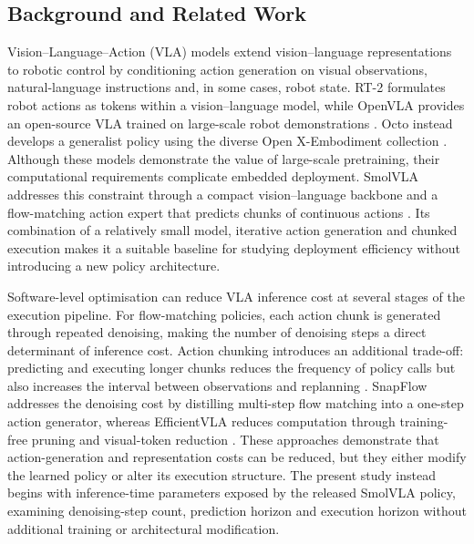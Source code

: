 \subsection{Background and Related Work}
Vision--Language--Action (VLA) models extend vision--language representations to robotic control by conditioning action generation on visual observations, natural-language instructions and, in some cases, robot state. RT-2 formulates robot actions as tokens within a vision--language model, while OpenVLA provides an open-source VLA trained on large-scale robot demonstrations \cite{rt2,openvla}. Octo instead develops a generalist policy using the diverse Open X-Embodiment collection \cite{octo,openx}. Although these models demonstrate the value of large-scale pretraining, their computational requirements complicate embedded deployment. SmolVLA addresses this constraint through a compact vision--language backbone and a flow-matching action expert that predicts chunks of continuous actions \cite{smolvla}. Its combination of a relatively small model, iterative action generation and chunked execution makes it a suitable baseline for studying deployment efficiency without introducing a new policy architecture.

Software-level optimisation can reduce VLA inference cost at several stages of the execution pipeline. For flow-matching policies, each action chunk is generated through repeated denoising, making the number of denoising steps a direct determinant of inference cost. Action chunking introduces an additional trade-off: predicting and executing longer chunks reduces the frequency of policy calls but also increases the interval between observations and replanning \cite{smolvla}. SnapFlow addresses the denoising cost by distilling multi-step flow matching into a one-step action generator, whereas EfficientVLA reduces computation through training-free pruning and visual-token reduction \cite{snapflow,efficientvla}. These approaches demonstrate that action-generation and representation costs can be reduced, but they either modify the learned policy or alter its execution structure. The present study instead begins with inference-time parameters exposed by the released SmolVLA policy, examining denoising-step count, prediction horizon and execution horizon without additional training or architectural modification.

